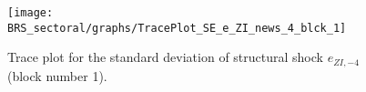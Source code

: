 \begin{figure}[H]
\centering
  \texttt{[image: BRS\_sectoral/graphs/TracePlot\_SE\_e\_ZI\_news\_4\_blck\_1]}\\
    \caption{Trace plot for the standard deviation of structural shock ${e_{ZI,-4}}$ (block number 1).}
\end{figure}
